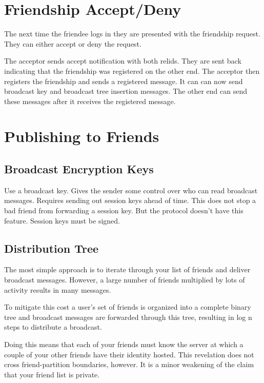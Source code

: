 \documentclass[letterpaper,11pt,oneside]{article}
\begin{document}
\section{Friendship Accept/Deny}

The next time the friendee logs in they are presented with the friendship
request. They can either accept or deny the request. 

The acceptor sends accept notification with both relids. They are sent back
indicating that the friendship was registered on the other end. The acceptor
then registers the friendship and sends a registered message. It can can now
send broadcast key and broadcast tree insertion messages. The other end can
send these messages after it receives the registered message.

\section{Publishing to Friends}

\subsection{Broadcast Encryption Keys}

Use a broadcast key. Gives the sender some control over who can read broadcast
messages. Requires sending out session keys ahead of time. This does not stop a
bad friend from forwarding a session key. But the protocol doesn't have this
feature. Session keys must be signed.

\subsection{Distribution Tree}

The most simple approach is to iterate through your list of friends and deliver
broadcast messages. However, a large number of friends multiplied by lots of
activity results in many messages.  

To mitigate this cost a user's set of friends is organized into a complete
binary tree and broadcast messages are forwarded through this tree, resulting
in log n steps to distribute a broadcast.

Doing this means that each of your friends must know the server at which a
couple of your other friends have their identity hosted. This revelation does
not cross friend-partition boundaries, however. It is a minor weakening of the
claim that your friend list is private.
\end{document}

